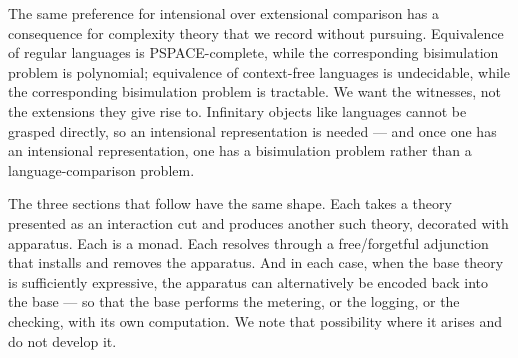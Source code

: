 \begin{remark}
The same preference for intensional over extensional comparison has a consequence for
complexity theory that we record without pursuing. Equivalence of regular languages is
\textsc{PSPACE}-complete, while the corresponding bisimulation problem is polynomial;
equivalence of context-free languages is undecidable, while the corresponding
bisimulation problem is tractable. We want the witnesses, not the extensions they give
rise to. Infinitary objects like languages cannot be grasped directly, so an intensional
representation is needed --- and once one has an intensional representation, one has a
bisimulation problem rather than a language-comparison problem.
\end{remark}


The three sections that follow have the same shape. Each takes a theory presented as an
interaction cut and produces another such theory, decorated with apparatus. Each is a
monad. Each resolves through a free/forgetful adjunction that installs and removes the
apparatus. And in each case, when the base theory is sufficiently expressive, the
apparatus can alternatively be encoded back into the base --- so that the base performs
the metering, or the logging, or the checking, with its own computation. We note that
possibility where it arises and do not develop it.

